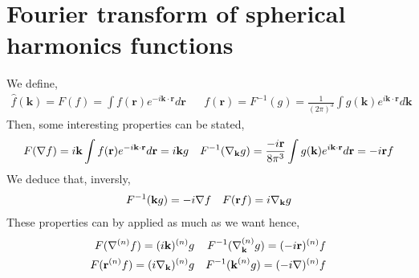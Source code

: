 \section{Fourier transform of spherical harmonics functions}

We define,
\begin{align}
    \hat{f}(\textbf{k}) = F(f) = \int f(\textbf{r}) e^{-i\textbf{k}\cdot \textbf{r}} d\textbf{r}
    &&
    f(\textbf{r}) = F^{-1}(g)= \frac{1}{(2\pi)^3}\int g(\textbf{k}) e^{i\textbf{k}\cdot \textbf{r}} d\textbf{k}
\end{align}
Then, some interesting properties can be stated,
\begin{align}
    F(\mathbf{\nabla} f)
    =
    i \textbf{k} \int f(\textbf{r}) e^{-i\textbf{k}\cdot \textbf{r}} d\textbf{r}
    =
    i \textbf{k} g
    &&
    F^{-1}(\mathbf{\nabla}_\textbf{k} g)
    =
    \frac{-i\textbf{r}}{8\pi^3} \int g(\textbf{k}) e^{i\textbf{k}\cdot \textbf{r}} d\textbf{r}
    =
    - i \textbf{r} f
\end{align}
We deduce that, inversly,
\begin{align}
    F^{-1}(\textbf{k} g)
    =
    - i \mathbf{\nabla} f
    &&
    F(\textbf{r} f)
    = i \mathbf{\nabla}_\textbf{k} g
\end{align}
These properties can by applied as much as we want hence,
\begin{align}
    F(\mathbf{\nabla}^{(n)} f) = (i\textbf{k})^{(n)}g
    &&
    F^{-1}(\mathbf{\nabla}_\textbf{k}^{(n)} g) = (-i\textbf{r})^{(n)} f\\
    F(\textbf{r}^{(n)} f) = (i\mathbf{\nabla}_\textbf{k})^{(n)} g
    &&
    F^{-1}(\textbf{k}^{(n)} g) = (-i\mathbf{\nabla})^{(n)}f
\end{align}

